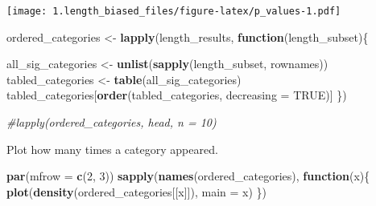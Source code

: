 \documentclass[]{article}
\newenvironment{Shaded}{\begin{snugshade}}{\end{snugshade}}
\newcommand{\KeywordTok}[1]{\textcolor[rgb]{0.13,0.29,0.53}{\textbf{#1}}}
\newcommand{\DataTypeTok}[1]{\textcolor[rgb]{0.13,0.29,0.53}{#1}}
\newcommand{\DecValTok}[1]{\textcolor[rgb]{0.00,0.00,0.81}{#1}}
\newcommand{\StringTok}[1]{\textcolor[rgb]{0.31,0.60,0.02}{#1}}
\newcommand{\CommentTok}[1]{\textcolor[rgb]{0.56,0.35,0.01}{\textit{#1}}}
\newcommand{\OtherTok}[1]{\textcolor[rgb]{0.56,0.35,0.01}{#1}}
\newcommand{\ControlFlowTok}[1]{\textcolor[rgb]{0.13,0.29,0.53}{\textbf{#1}}}
\newcommand{\OperatorTok}[1]{\textcolor[rgb]{0.81,0.36,0.00}{\textbf{#1}}}
\newcommand{\NormalTok}[1]{#1}
\begin{document}
\begin{Shaded}
\end{Shaded}

\texttt{[image: 1.length\_biased\_files/figure-latex/p\_values-1.pdf]}

\begin{Shaded}
\begin{Highlighting}[]
\NormalTok{ordered_categories <-}\StringTok{ }\KeywordTok{lapply}\NormalTok{(length_results, }\ControlFlowTok{function}\NormalTok{(length_subset)\{}
  
\NormalTok{  all_sig_categories <-}\StringTok{ }\KeywordTok{unlist}\NormalTok{(}\KeywordTok{sapply}\NormalTok{(length_subset, rownames))}
\NormalTok{  tabled_categories  <-}\StringTok{ }\KeywordTok{table}\NormalTok{(all_sig_categories)}
\NormalTok{  tabled_categories[}\KeywordTok{order}\NormalTok{(tabled_categories, }\DataTypeTok{decreasing =} \OtherTok{TRUE}\NormalTok{)]}
\NormalTok{\})}

\CommentTok{#lapply(ordered_categories, head, n = 10)}
\end{Highlighting}
\end{Shaded}

Plot how many times a category appeared.

\begin{Shaded}
\begin{Highlighting}[]
\KeywordTok{par}\NormalTok{(}\DataTypeTok{mfrow =} \KeywordTok{c}\NormalTok{(}\DecValTok{2}\NormalTok{, }\DecValTok{3}\NormalTok{))}
\KeywordTok{sapply}\NormalTok{(}\KeywordTok{names}\NormalTok{(ordered_categories), }\ControlFlowTok{function}\NormalTok{(x)\{}
  \KeywordTok{plot}\NormalTok{(}\KeywordTok{density}\NormalTok{(ordered_categories[[x]]), }\DataTypeTok{main =}\NormalTok{ x)}
\NormalTok{\})}
\end{Highlighting}
\end{Shaded}
\end{document}
